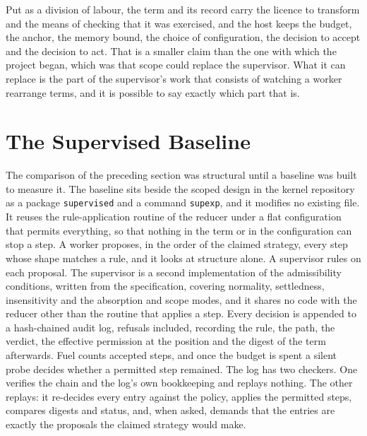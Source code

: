\documentclass[11pt]{article}
\theoremstyle{definition}
\theoremstyle{remark}
\begin{document}
Put as a division of labour, the term and its record carry the licence to transform and the means of checking that it was exercised, and the host keeps the budget, the anchor, the memory bound, the choice of configuration, the decision to accept and the decision to act. That is a smaller claim than the one with which the project began, which was that scope could replace the supervisor. What it can replace is the part of the supervisor's work that consists of watching a worker rearrange terms, and it is possible to say exactly which part that is.

\section{The Supervised Baseline}\label{sec:experiment}

The comparison of the preceding section was structural until a baseline was built to measure it. The baseline sits beside the scoped design in the kernel repository as a package \texttt{supervised} and a command \texttt{supexp}, and it modifies no existing file. It reuses the rule-application routine of the reducer under a flat configuration that permits everything, so that nothing in the term or in the configuration can stop a step. A worker proposes, in the order of the claimed strategy, every step whose shape matches a rule, and it looks at structure alone. A supervisor rules on each proposal. The supervisor is a second implementation of the admissibility conditions, written from the specification, covering normality, settledness, insensitivity and the absorption and scope modes, and it shares no code with the reducer other than the routine that applies a step. Every decision is appended to a hash-chained audit log, refusals included, recording the rule, the path, the verdict, the effective permission at the position and the digest of the term afterwards. Fuel counts accepted steps, and once the budget is spent a silent probe decides whether a permitted step remained. The log has two checkers. One verifies the chain and the log's own bookkeeping and replays nothing. The other replays: it re-decides every entry against the policy, applies the permitted steps, compares digests and status, and, when asked, demands that the entries are exactly the proposals the claimed strategy would make.
\end{document}
